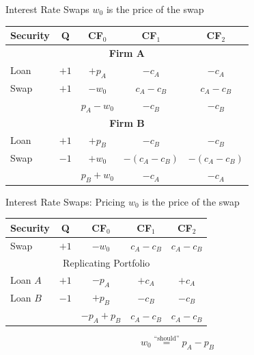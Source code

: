 \documentclass{beamer}
\begin{document}
\begin{frame}{Interest Rate Swaps}
    $w_{0}$ is the price of the swap
    \begin{center}
        \begin{tabular}{lcccc}
            Security & Q & CF$_{0}$ & CF$_{1}$ & CF$_{2}$\\ \hline
            \multicolumn{5}{c}{\textbf{Firm A}} \\ \hline
            Loan & $+1$ & $+p_{A}$ & $-c_{A}$ & $-c_{A}$\\
            Swap & $+1$ & $-w_{0}$ & $c_{A}-c_{B}$ & $c_{A}-c_{B}$ \\ \hline
            & & $p_{A}-w_{0}$ & $-c_{B}$ & $-c_{B}$ \\ \hline
            \multicolumn{5}{c}{\textbf{Firm B}} \\ \hline
            Loan & $+1$ & $+p_{B}$ & $-c_{B}$ & $-c_{B}$ \\
            Swap & $-1$ & $+w_{0}$ & $-(c_{A}-c_{B})$ & $-(c_{A}-c_{B})$ \\ \hline
            & & $p_{B}+w_{0}$ & $-c_{A}$ & $-c_{A}$
        \end{tabular}
    \end{center}
\end{frame}

\begin{frame}{Interest Rate Swaps: Pricing}
    $w_{0}$ is the price of the swap
    \begin{center}
        \begin{tabular}{lcccc}
            Security & Q & CF$_{0}$ & CF$_{1}$ & CF$_{2}$\\ \hline
            Swap & $+1$ & $-w_{0}$ & $c_{A}-c_{B}$ & $c_{A}-c_{B}$ \\ \hline
            \multicolumn{5}{c}{Replicating Portfolio} \\ \hline
            Loan $A$ & $+1$ & $-p_{A}$ & $+c_{A}$ & $+c_{A}$ \\ 
            Loan $B$ & $-1$ & $+p_{B}$ & $-c_{B}$ & $-c_{B}$ \\ \hline
            & & $-p_{A}+p_{B}$ & $c_{A}-c_{B}$ & $c_{A}-c_{B}$
        \end{tabular}
    \end{center}
    \begin{equation}
        \boxed{w_{0}\overset{\text{``should''}}{=}p_{A}-p_{B}}
    \end{equation}
\end{frame}

\end{document}
